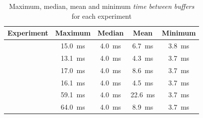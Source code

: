 \begin{table}[h]
    \centering
    \renewcommand{\arraystretch}{1.1}
    \begin{tabularx}{\textwidth}{|>{\raggedleft\arraybackslash}X||c|c|c|c|}
        \hline
        \textbf{Experiment} & \textbf{Maximum} & \textbf{Median} & \textbf{Mean} & \textbf{Minimum} \\
        \hline

        \nameref{evaluation/results/trace-no-delay} &
        \SI{15.0}{\milli\second} &
        \SI{4.0}{\milli\second} &
        \SI{6.7}{\milli\second} &
        \SI{3.8}{\milli\second}
        \\
        \hline

        \nameref{evaluation/results/trace-100us-delay} &
        \SI{13.1}{\milli\second} &
        \SI{4.0}{\milli\second} &
        \SI{4.3}{\milli\second} &
        \SI{3.7}{\milli\second}
        \\
        \hline

        \nameref{evaluation/results/synthetic-read-write-instructions-no-delay} &
        \SI{17.0}{\milli\second} &
        \SI{4.0}{\milli\second} &
        \SI{8.6}{\milli\second} &
        \SI{3.7}{\milli\second}
        \\
        \hline

        \nameref{evaluation/results/synthetic-read-write-instructions-100us-delay} &
        \SI{16.1}{\milli\second} &
        \SI{4.0}{\milli\second} &
        \SI{4.5}{\milli\second} &
        \SI{3.7}{\milli\second}
        \\
        \hline

        \nameref{evaluation/results/synthetic-ping-instructions-no-delay} &
        \SI{59.1}{\milli\second} &
        \SI{4.0}{\milli\second} &
        \SI{22.6}{\milli\second} &
        \SI{3.7}{\milli\second}
        \\
        \hline

        \nameref{evaluation/results/synthetic-ping-instructions-100us-delay} &
        \SI{64.0}{\milli\second} &
        \SI{4.0}{\milli\second} &
        \SI{8.9}{\milli\second} &
        \SI{3.7}{\milli\second}
        \\
        \hline
    \end{tabularx}
    \caption{Maximum, median, mean and minimum \textit{time between buffers} for each experiment}
\end{table}
